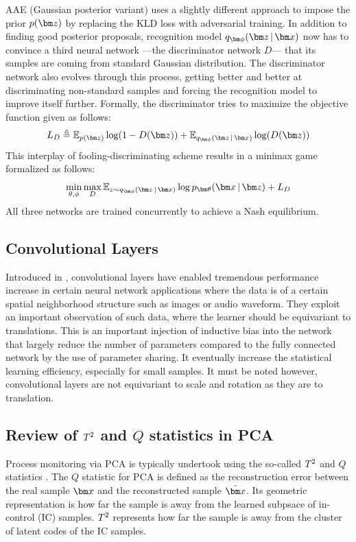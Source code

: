\documentclass[journal, peerreview]{IEEEtran}
\begin{document}
AAE (Gaussian posterior variant) \cite{Makhzani2015-ei} uses a slightly different approach to impose the prior $\pz$ by replacing the KLD loss with adversarial training. 
In addition to finding good posterior proposals, recognition model $\encoding$ now has to convince a third neural network ---the discriminator network $D$--- that its samples are coming from standard Gaussian distribution.
The discriminator network also evolves through this process, getting better and better at discriminating non-standard samples and forcing the recognition model to improve itself further.
Formally, the discriminator tries to maximize the objective function given as follows:
\begin{equation}
\label{eqn:discloss}
	 L_{D} \triangleq  \E_{\pz} \log(1 - D(\mbz)) +  \E_{\encoding} \log(D(\mbz))
\end{equation}
This interplay of fooling-discriminating scheme results in a minimax game formalized as follows:
\begin{equation}
\label{eqn:aae-loss}
	\min_{\theta,\phi}\max_{D} \E_{z \sim \encoding}\log\decoding + L_{D}
\end{equation}
All three networks are trained concurrently to achieve a Nash equilibrium.

\subsection{Convolutional Layers}
Introduced in \cite{lecun1989backpropagation}, convolutional layers have enabled tremendous performance increase in certain neural network applications where the data is of a certain spatial neighborhood structure such as images or audio waveform.
They exploit an important observation of such data, where the learner should be equivariant to translations.
This is an important injection of inductive bias into the network that largely reduce the number of parameters compared to the fully connected network by the use of parameter sharing. It eventually increase the statistical learning efficiency, especially for small samples.
It must be noted however, convolutional layers are not equivariant to scale and rotation as they are to translation.

\subsection{Review of $T^{2} $ and $Q$ statistics in PCA}
\label{sec:bckgrnd:ReviewPCA}
Process monitoring via PCA is typically undertook using the so-called $ T^{2} $ and $ Q $ statistics \cite{Chen2004-px}. 
The $ Q $ statistic for PCA is defined as the reconstruction error between the real sample $ \mbx $ and the reconstructed sample $ \tilde{\mbx} $. Its geometric representation is how far the sample is away from the learned subpsace of in-control (IC) samples.  $ T^{2} $ represents how far the sample is away from the cluster of latent codes of the IC samples. 
\end{document}
